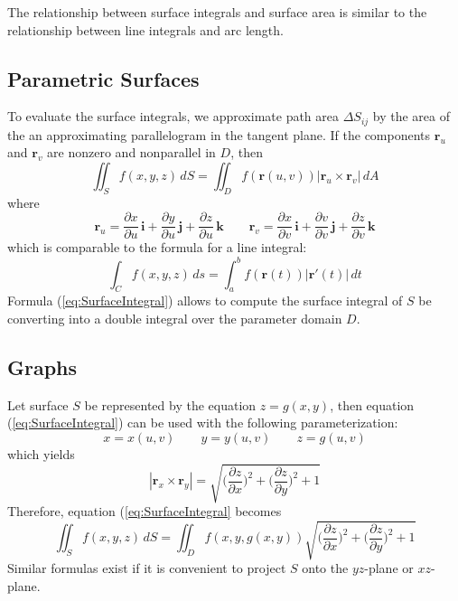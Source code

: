 \documentclass[../main.tex]{subfiles}
\begin{document}
The relationship between surface integrals and surface area is similar to the relationship between line integrals and arc length.

\subsection{Parametric Surfaces}
To evaluate the surface integrals, we approximate path area $\Delta S_{ij}$ by the area of the an approximating parallelogram in the tangent plane. If the components $\textbf{r}_u$ and $\textbf{r}_v$ are nonzero and nonparallel in $D$, then
\begin{equation}\label{eq:SurfaceIntegral}
\iint_S{f(x,y,z)\,dS} = \iint_D{f(\textbf{r}(u,v))|\textbf{r}_u \times \textbf{r}_v|\,dA}
\end{equation}
where 
\begin{equation*}
\textbf{r}_u = \frac{\partial x}{\partial u}\,\textbf{i} + \frac{\partial y}{\partial u}\,\textbf{j} + \frac{\partial z}{\partial u}\,\textbf{k}\qquad\textbf{r}_v = \frac{\partial x}{\partial v}\,\textbf{i} + \frac{\partial v}{\partial v}\,\textbf{j} + \frac{\partial z}{\partial v}\,\textbf{k}
\end{equation*}
which is comparable to the formula for a line integral:
\begin{equation*}
\int_C{f(x,y,z)\,ds} = \int_a^b{f(\textbf{r}(t))|\textbf{r}'(t)|\,dt}
\end{equation*}
Formula (\ref{eq:SurfaceIntegral}) allows to compute the surface integral of $S$ be converting into a double integral over the parameter domain $D$.

\subsection{Graphs}
Let surface $S$ be represented by the equation $z = g(x,y)$, then equation (\ref{eq:SurfaceIntegral}) can be used with the following parameterization:
\begin{equation*}
x = x(u,v) \qquad y = y(u,v) \qquad z = g(u,v)
\end{equation*}
which yields
\begin{equation*}
|\textbf{r}_x \times \textbf{r}_y| = \sqrt{\Bigg(\frac{\partial z}{\partial x}\Bigg)^2 + \Bigg(\frac{\partial z}{\partial y}\Bigg)^2 + 1}
\end{equation*}
Therefore, equation (\ref{eq:SurfaceIntegral} becomes
\begin{equation*}
\iint_S{f(x,y,z)\,dS} = \iint_D{f(x,y,g(x,y))\sqrt{\Bigg(\frac{\partial z}{\partial x}\Bigg)^2 + \Bigg(\frac{\partial z}{\partial y}\Bigg)^2 + 1}}
\end{equation*}
Similar formulas exist if it is convenient to project $S$ onto the $yz$-plane or $xz$-plane.
\end{document}
